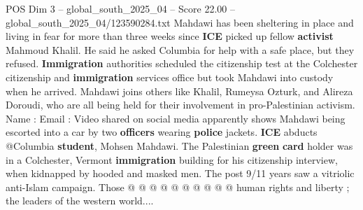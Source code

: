 \begin{textsample}{POS Dim 3 – global\_south\_2025\_04 – Score 22.00 – global\_south\_2025\_04/123590284.txt}
Mahdawi has been sheltering in place and living in fear for more than three weeks since \textbf{ICE} picked up fellow \textbf{activist} Mahmoud Khalil.
He said he asked Columbia for help with a safe place, but they refused. \textbf{Immigration} authorities scheduled the citizenship test at the Colchester citizenship and \textbf{immigration} services office but took Mahdawi into custody when he arrived.
Mahdawi joins others like Khalil, Rumeysa Ozturk, and Alireza Doroudi, who are all being held for their involvement in pro-Palestinian activism.
Name : Email : Video shared on social media apparently shows Mahdawi being escorted into a car by two \textbf{officers} wearing \textbf{police} jackets. \textbf{ICE} abducts @Columbia \textbf{student}, Mohsen Mahdawi.
The Palestinian \textbf{green} \textbf{card} holder was in a Colchester, Vermont \textbf{immigration} building for his citizenship interview, when kidnapped by hooded and masked men.
The post 9/11 years saw a vitriolic anti-Islam campaign.
Those @ @ @ @ @ @ @ @ @ @ human rights and liberty ; the leaders of the western world....

\end{textsample}
